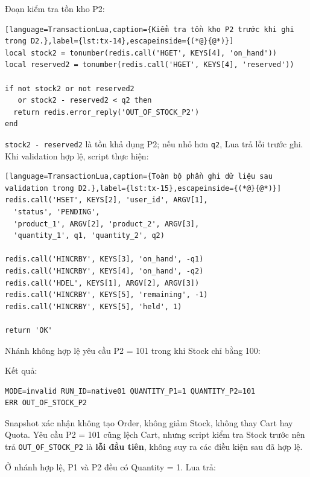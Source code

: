 Đoạn kiểm tra tồn kho P2:

\reportblockspace{72pt}
\begin{lstlisting}[language=TransactionLua,caption={Kiểm tra tồn kho P2 trước khi ghi trong D2.},label={lst:tx-14},escapeinside={(*@}{@*)}]
local stock2 = tonumber(redis.call('HGET', KEYS[4], 'on_hand'))
local reserved2 = tonumber(redis.call('HGET', KEYS[4], 'reserved'))

if not stock2 or not reserved2
   or stock2 - reserved2 < q2 then
  return redis.error_reply('OUT_OF_STOCK_P2')
end
\end{lstlisting}

\texttt{stock2 -\allowbreak{} reserved2} là tồn khả dụng P2; nếu nhỏ hơn \texttt{q2}, Lua trả lỗi trước ghi. Khi validation hợp lệ, script thực hiện:

\reportblockspace{72pt}
\begin{lstlisting}[language=TransactionLua,caption={Toàn bộ phần ghi dữ liệu sau validation trong D2.},label={lst:tx-15},escapeinside={(*@}{@*)}]
redis.call('HSET', KEYS[2], 'user_id', ARGV[1],
  'status', 'PENDING',
  'product_1', ARGV[2], 'product_2', ARGV[3],
  'quantity_1', q1, 'quantity_2', q2)

redis.call('HINCRBY', KEYS[3], 'on_hand', -q1)
redis.call('HINCRBY', KEYS[4], 'on_hand', -q2)
redis.call('HDEL', KEYS[1], ARGV[2], ARGV[3])
redis.call('HINCRBY', KEYS[5], 'remaining', -1)
redis.call('HINCRBY', KEYS[5], 'held', 1)

return 'OK'
\end{lstlisting}

Nhánh không hợp lệ yêu cầu P2 = 101 trong khi Stock chỉ bằng 100:

Kết quả:

\reportblockspace{72pt}
\begingroup
{}\label{result:tx-9}
\nopagebreak[4]
\begin{Verbatim}
MODE=invalid RUN_ID=native01 QUANTITY_P1=1 QUANTITY_P2=101
ERR OUT_OF_STOCK_P2
\end{Verbatim}
\endgroup\par\smallskip
Snapshot xác nhận không tạo Order, không giảm Stock, không thay Cart hay Quota. Yêu cầu P2 = 101 cũng lệch Cart, nhưng script kiểm tra Stock trước nên trả \texttt{OUT\_\allowbreak{}OF\_\allowbreak{}STOCK\_\allowbreak{}P2} là \textbf{lỗi đầu tiên}, không suy ra các điều kiện sau đã hợp lệ.

Ở nhánh hợp lệ, P1 và P2 đều có Quantity = 1. Lua trả:

